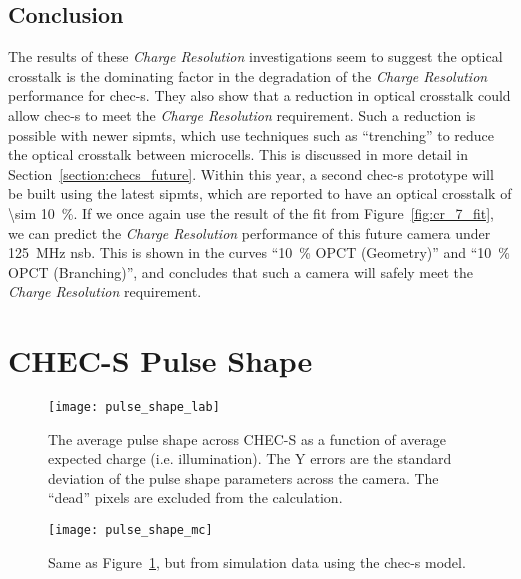 \subsection{Conclusion}

The results of these \textit{Charge Resolution} investigations seem to suggest the optical crosstalk is the dominating factor in the degradation of the \textit{Charge Resolution} performance for \gls{chec-s}. They also show that a reduction in optical crosstalk could allow \gls{chec-s} to meet the \textit{Charge Resolution} requirement. Such a reduction is possible with newer \glspl{sipmt}, which use techniques such as ``trenching'' to reduce the optical crosstalk between microcells. This is discussed in more detail in Section~\ref{section:checs_future}. Within this year, a second \gls{chec-s} prototype will be built using the latest \glspl{sipmt}, which are reported to have an optical crosstalk of \SI{\sim 10}{\percent}. If we once again use the result of the fit from Figure~\ref{fig:cr_7_fit}, we can predict the \textit{Charge Resolution} performance of this future camera under \SI{125}{MHz} \gls{nsb}. This is shown in the curves ``\SI{10}{\percent} OPCT (Geometry)'' and ``\SI{10}{\percent} OPCT (Branching)'', and concludes that such a camera will safely meet the \textit{Charge Resolution} requirement.

\section{CHEC-S Pulse Shape} \label{section:pulse_shape_results}

\begin{figure}
	\centering
    \texttt{[image: pulse\_shape\_lab]} 
	\caption[Pulse shape versus average expected charge for CHEC-S.]{The average pulse shape across CHEC-S as a function of average expected charge (i.e. illumination). The Y errors are the standard deviation of the pulse shape parameters across the camera. The ``dead'' pixels are excluded from the calculation.}
	\label{fig:pulse_shape_lab}
\end{figure}

\begin{figure}
	\centering
    \texttt{[image: pulse\_shape\_mc]} 
	\caption[Pulse shape versus average expected charge for a CHEC-S simulation.]{Same as Figure~\ref{fig:pulse_shape_lab}, but from simulation data using the \gls{chec-s} model.}
	\label{fig:pulse_shape_mc}
\end{figure}

